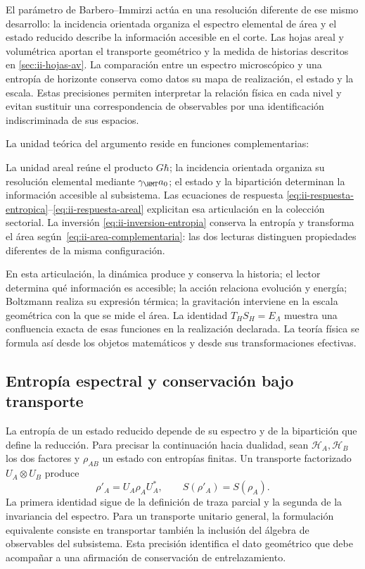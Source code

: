 El parámetro de Barbero--Immirzi actúa en una resolución diferente
de ese mismo desarrollo: la incidencia orientada organiza el espectro
elemental de área y el estado reducido describe la información
accesible en el corte. Las hojas areal y volumétrica aportan el
transporte geométrico y la medida de historias descritos en
\cref{sec:ii-hojas-av}. La comparación entre un espectro microscópico
y una entropía de horizonte conserva como datos su mapa de realización,
el estado y la escala. Estas precisiones permiten interpretar la
relación física en cada nivel y evitan sustituir una correspondencia
de observables por una identificación indiscriminada de sus espacios.

La unidad teórica del argumento reside en funciones complementarias:

La unidad areal reúne el producto $G\hbar$; la incidencia orientada
organiza su resolución elemental mediante $\gamma_{\HMT}a_0$; el
estado y la bipartición determinan la información accesible al
subsistema. Las ecuaciones de respuesta
\eqref{eq:ii-respuesta-entropica}--\eqref{eq:ii-respuesta-areal}
explicitan esa articulación en la colección sectorial. La inversión
\eqref{eq:ii-inversion-entropia} conserva la entropía y transforma
el área según~\eqref{eq:ii-area-complementaria}: las dos lecturas
distinguen propiedades diferentes de la misma configuración.

En esta articulación,
la dinámica produce y conserva la historia; el lector determina qué
información es accesible; la acción relaciona evolución y energía;
Boltzmann realiza su expresión térmica; la gravitación interviene
en la escala geométrica con la que se mide el área. La identidad
\(T_HS_H=E_\Lambda\) muestra una confluencia exacta de esas funciones
en la realización declarada. La teoría física se formula así desde
los objetos matemáticos y desde sus transformaciones efectivas.

\subsection{Entropía espectral y conservación bajo transporte}

La entropía de un estado reducido depende de su espectro y de la
bipartición que define la reducción. Para precisar la continuación
hacia dualidad, sean \(\mathcal H_A,\mathcal H_B\) los dos factores
y \(\rho_{AB}\) un estado con entropías finitas. Un transporte
factorizado \(U_A\otimes U_B\) produce
\[
 \rho'_A=U_A\rho_AU_A^*,\qquad S(\rho'_A)=S(\rho_A).
\]
La primera identidad sigue de la definición de traza parcial y la
segunda de la invariancia del espectro. Para un transporte unitario
general, la formulación equivalente consiste en transportar también
la inclusión del álgebra de observables del subsistema. Esta precisión
identifica el dato geométrico que debe acompañar a una afirmación
de conservación de entrelazamiento.

